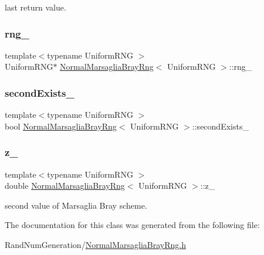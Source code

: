 last return value. 

\hypertarget{class_normal_marsaglia_bray_rng_aa3741fc5dcca3f53aed89d2ec76d0402}{}\label{class_normal_marsaglia_bray_rng_aa3741fc5dcca3f53aed89d2ec76d0402} 
\subsubsection{\texorpdfstring{rng\+\_\+}{rng\_}}
{\footnotesize\ttfamily template$<$typename Uniform\+R\+NG $>$ \\
Uniform\+R\+NG$\ast$ \hyperlink{class_normal_marsaglia_bray_rng}{Normal\+Marsaglia\+Bray\+Rng}$<$ Uniform\+R\+NG $>$\+::rng\+\_\+\hspace{0.3cm}{\ttfamily [private]}}

\hypertarget{class_normal_marsaglia_bray_rng_a6b795b729e795b1b81aa1b30d5dfe8ef}{}\label{class_normal_marsaglia_bray_rng_a6b795b729e795b1b81aa1b30d5dfe8ef} 
\subsubsection{\texorpdfstring{second\+Exists\+\_\+}{secondExists\_}}
{\footnotesize\ttfamily template$<$typename Uniform\+R\+NG $>$ \\
bool \hyperlink{class_normal_marsaglia_bray_rng}{Normal\+Marsaglia\+Bray\+Rng}$<$ Uniform\+R\+NG $>$\+::second\+Exists\+\_\+\hspace{0.3cm}{\ttfamily [private]}}

\hypertarget{class_normal_marsaglia_bray_rng_a6d021a285cd0eb2d95c25cdb8af0ee93}{}\label{class_normal_marsaglia_bray_rng_a6d021a285cd0eb2d95c25cdb8af0ee93} 
\subsubsection{\texorpdfstring{z\+\_\+}{z\_}}
{\footnotesize\ttfamily template$<$typename Uniform\+R\+NG $>$ \\
double \hyperlink{class_normal_marsaglia_bray_rng}{Normal\+Marsaglia\+Bray\+Rng}$<$ Uniform\+R\+NG $>$\+::z\+\_\+\hspace{0.3cm}{\ttfamily [private]}}



second value of Marsaglia Bray scheme. 



The documentation for this class was generated from the following file\+:\begin{DoxyCompactItemize}
\item 
Rand\+Num\+Generation/\hyperlink{_normal_marsaglia_bray_rng_8h}{Normal\+Marsaglia\+Bray\+Rng.\+h}\end{DoxyCompactItemize}
